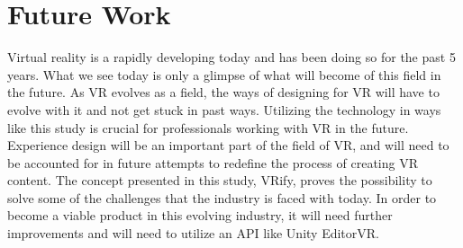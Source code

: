 \chapter{Future Work}
Virtual reality is a rapidly developing today and has been doing so for the past 5 years. What we see today is only a glimpse of what will become of this field in the future. As VR evolves as a field, the ways of designing for VR will have to evolve with it and not get stuck in past ways. Utilizing the technology in ways like this study is crucial for professionals working with VR in the future. Experience design will be an important part of the field of VR, and will need to be accounted for in future attempts to redefine the process of creating VR content. The concept presented in this study, VRify, proves the possibility to solve some of the challenges that the industry is faced with today. In order to become a viable product in this evolving industry, it will need further improvements and will need to utilize an API like Unity EditorVR.  
